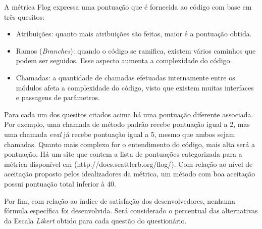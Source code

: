 A métrica Flog expressa uma pontuação que é fornecida ao código com base em três quesitos:

\begin{itemize}
	\item Atribuições: quanto mais atribuições são feitas, maior é a pontuação obtida.
	\item Ramos (\textit{Branches}): quando o código se ramifica, existem vários caminhos que podem ser seguidos. Esse aspecto aumenta a complexidade do código.
	\item Chamadas: a quantidade de chamadas efetuadas internamente entre os módulos afeta a complexidade do código, visto que existem muitas interfaces e passagens de parâmetros.
\end{itemize}

Para cada um dos quesitos citados acima há uma pontuação diferente associada. Por exemplo, uma chamada de método padrão recebe pontuação igual a 2, mas uma chamada \textit{eval} já recebe pontuação igual a 5, mesmo que ambos sejam chamadas. Quanto mais complexo for o entendimento do código, mais alta será a pontuação. Há um site que contem a lista de pontuações categorizada para a métrica disponível em (http://docs.seattlerb.org/flog/). Com relação ao nível de aceitação proposto pelos idealizadores da métrica, um método com boa aceitação possui pontuação total inferior à 40.

Por fim, com relação ao índice de satisfação dos desenvolvedores, nenhuma fórmula específica foi desenvolvida. Será considerado o percentual das alternativas da Escala \textit{Likert} obtido para cada questão do questionário.